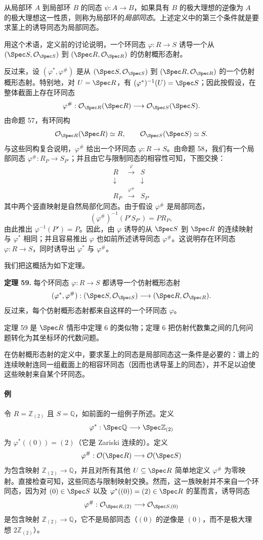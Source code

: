从局部环 $A$ 到局部环 $B$ 的同态 $\psi:A\to B$，如果具有 $B$ 的极大理想的逆像为 $A$ 的极大理想这一性质，则称为局部环的\emph{局部同态}。上述定义中的第三个条件就是要求茎上的诱导同态为局部同态。

用这个术语，定义前的讨论说明，一个环同态 $\varphi:R\to S$ 诱导一个从 $(\Spec S,\mathcal O_{\Spec S})$ 到 $(\Spec R,\mathcal O_{\Spec R})$ 的仿射概形态射。

反过来，设 $(\varphi^*,\varphi^\#)$ 是从 $(\Spec S,\mathcal O_{\Spec S})$ 到 $(\Spec R,\mathcal O_{\Spec R})$ 的一个仿射概形态射。特别地，对 $U=\Spec R$，有 $(\varphi^*)^{-1}(U)=\Spec S$；因此按假设，在整体截面上存在环同态
\[
\varphi^\#: \mathcal O_{\Spec R}(\Spec R)
\longrightarrow
\mathcal O_{\Spec S}(\Spec S).
\]
由命题 57，有环同构
\[
\mathcal O_{\Spec R}(\Spec R)\simeq R,
\qquad
\mathcal O_{\Spec S}(\Spec S)\simeq S.
\]
与这些同构复合说明，$\varphi^\#$ 给出一个环同态 $\varphi:R\to S$。由命题 58，我们有一个局部同态 $\varphi^\#:R_P\to S_{P'}$；并且由它与限制同态的相容性可知，下图交换：
\[
\begin{array}{ccc}
	R & \xrightarrow{\varphi} & S\\
	\downarrow & & \downarrow\\
	R_P & \xrightarrow{\varphi^\#} & S_{P'}
\end{array}
\]
其中两个竖直映射是自然局部化同态。由于假设 $\varphi^\#$ 是局部同态，
\[
(\varphi^\#)^{-1}(P'S_{P'})=PR_P,
\]
由此推出 $\varphi^{-1}(P')=P$。因此，由 $\varphi$ 诱导的从 $\Spec S$ 到 $\Spec R$ 的连续映射与 $\varphi^*$ 相同；并且容易推出 $\varphi$ 也如前所述诱导同态 $\varphi^\#$。这说明存在环同态 $\varphi:R\to S$，同时诱导出 $\varphi^*$ 与 $\varphi^\#$。

我们把这概括为如下定理。

\noindent\textbf{定理 59.} 每个环同态 $\varphi:R\to S$ 都诱导一个仿射概形态射
\[
(\varphi^*,\varphi^\#):(\Spec S,\mathcal O_{\Spec S})
\longrightarrow
(\Spec R,\mathcal O_{\Spec R}).
\]
反过来，每个仿射概形态射都来自这样的一个环同态 $\varphi$。

定理 59 是 $\Spec R$ 情形中定理 6 的类似物；定理 6 把仿射代数集之间的几何问题转化为其坐标环的代数问题。

在仿射概形态射的定义中，要求茎上的同态是局部同态这一条件是必要的：谱上的连续映射连同一组截面上的相容环同态（因而也诱导茎上的同态），并不足以迫使这些映射来自某个环同态。

\paragraph{例}
令 $R=\mathbb Z_{(2)}$ 且 $S=\mathbb Q$，如前面的一组例子所述。定义
\[
\varphi^*:\Spec\mathbb Q\longrightarrow\Spec\mathbb Z_{(2)}
\]
为 $\varphi^*((0))=(2)$（它是 Zariski 连续的）。定义
\[
\varphi^\#:\mathcal O(\Spec R)\longrightarrow\mathcal O(\Spec S)
\]
为包含映射 $\mathbb Z_{(2)}\to\mathbb Q$，并且对所有其他 $U\subseteq\Spec R$ 简单地定义 $\varphi^\#$ 为零映射。直接检查可知，这些同态与限制映射交换。然而，这一族映射并不来自一个环同态，因为对 $(0)\in\Spec S$ 以及 $\varphi^*((0))=(2)\in\Spec R$ 的茎而言，诱导同态
\[
\varphi^\#:\mathcal O_{\Spec R,(2)}\longrightarrow\mathcal O_{\Spec S,(0)}
\]
是包含映射 $\mathbb Z_{(2)}\to\mathbb Q$，它不是局部同态（$(0)$ 的逆像是 $(0)$，而不是极大理想 $2\mathbb Z_{(2)}$）。

